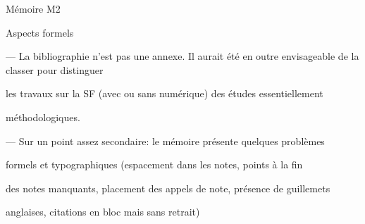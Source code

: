 \documentclass[letterpaper,portrait,12pt]{article}
\begin{document}
\setlength{\oddsidemargin}{1.2654in-1in}
\setlength{\textwidth}{\paperwidth - 1.1228in-1.2654in}

M\'{e}moire M2














Aspects formels





--- La bibliographie n'est pas une annexe. Il aurait \'{e}t\'{e} en outre envisageable de la classer pour distinguer


les travaux sur la SF (avec ou sans num\'{e}rique) des \'{e}tudes essentiellement


m\'{e}thodologiques.





--- Sur un point assez secondaire: le m\'{e}moire pr\'{e}sente quelques probl\`{e}mes


formels et typographiques (espacement dans les notes, points \`{a} la fin


des notes manquants, placement des appels de note, pr\'{e}sence de guillemets


anglaises, citations en bloc mais sans retrait)
\end{document}
